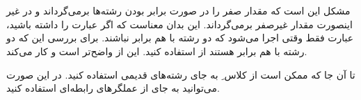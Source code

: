 \section{}
\paragraph{}\label{answer:76}
مشکل این است که  مقدار صفر را در صورت برابر بودن رشته‌ها برمی‌گرداند و در غیر اینصورت مقدار غیرصفر برمی‌گرداند. این بدان معناست که اگر عبارت  را داشته باشید، عبارت  فقط وقتی اجرا می‌شود که دو رشته با هم برابر نباشند. برای بررسی این که دو رشته با هم برابر هستند از  استفاده کنید. این از  واضح‌تر است و کار می‌کند.

تا آن جا که ممکن است از کلاس ِ  به جای رشته‌های قدیمی  استفاده کنید. در این صورت می‌توانید به جای  از عملگرهای رابطه‌ای  استفاده کنید.